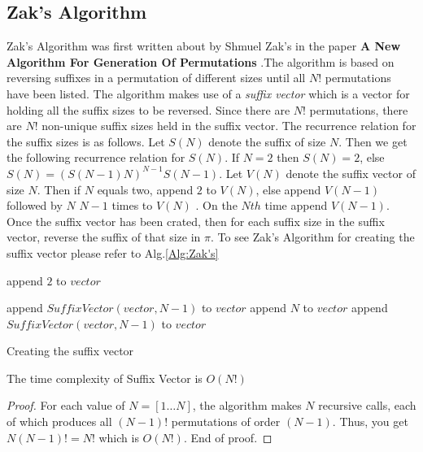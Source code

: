 \subsection{Zak's Algorithm}
Zak's Algorithm was first written about by Shmuel Zak's in the paper \textbf{A New Algorithm For
Generation Of Permutations} \cite{A31}.The algorithm is based on reversing suffixes in a permutation 
of different sizes until all $N!$ permutations have been listed. The algorithm makes 
use of a \emph{suffix vector} which is a vector for holding all the suffix sizes to be reversed. 
Since there are $N!$ permutations, there are $N!$ non-unique suffix sizes held in the suffix vector.
The recurrence relation for the suffix sizes is as follows. Let $S(N)$ denote the suffix  of size $N$. 
Then we get the following recurrence relation for $S(N)$. If $N=2$ then $S(N)=2$, else 
$S(N)=(S(N-1)N)^{N-1}S(N-1)$. Let $V(N)$ denote the suffix vector of size $N$. Then if $N$ equals 
two, append $2$ to $V(N)$, else append $V(N-1)$ followed by $N$ $N-1$ times to $V(N)$ \cite{A31}. On the $Nth$ time 
append $V(N-1)$. Once the suffix vector has been crated, then for each suffix size in the suffix vector, reverse 
the suffix of that size in $\pi$. To see Zak's Algorithm for creating the suffix vector please refer to 
Alg.\ref{Alg:Zak's}

\begin{algorithm}
    
    \begin{algorithmic}[1]
           \State append $2$ to $vector$
        
        \Else 
                \State append $SuffixVector(vector, N-1)$ to $vector$
                \State append $N$ to $vector$
            \EndFor
            \State append $SuffixVector(vector, N-1)$ to $vector$
        \EndIf
        \EndFunction
\end{algorithmic}
    \caption{Creating the suffix vector}
    \label{Alg:Zaks}
\end{algorithm}


\begin{lemma}
    The time complexity of Suffix Vector is $O(N!)$
\end{lemma}
\begin{proof}
    For each value of $N=[1 \dots N]$, the algorithm makes $N$ recursive calls, each of which produces all $(N-1)!$ permutations of 
    order $(N-1)$. Thus, you get $N(N-1)!=N!$ which is $O(N!)$. End of proof.
\end{proof}


